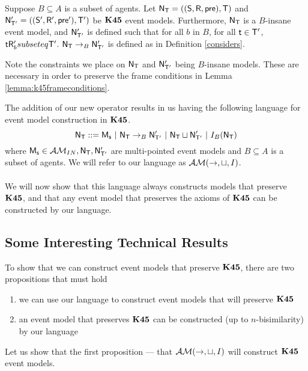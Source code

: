 \begin{defn} \label{defn:k45:considers}
	Suppose $B \subseteq A$ is a subset of agents.
	Let $\mathrm{\mathsf{N}}_\mathrm{\mathsf{T}} = ((\mathrm{\mathsf{S}},\mathrm{\mathsf{R}},\mathrm{\mathsf{pre}}),\mathrm{\mathsf{T}})$ and $\mathrm{\mathsf{N}}'_{\mathrm{\mathsf{T}}'} = ((\mathrm{\mathsf{S}}',\mathrm{\mathsf{R}}',\mathrm{\mathsf{pre}}'),\mathrm{\mathsf{T}}')$ be $\bf K45$ event models.
	Furthermore, $\mathrm{\mathsf{N}}_\mathrm{\mathsf{T}}$ is a $B$-insane event model, and $\mathrm{\mathsf{N}}'_{\mathrm{\mathsf{T}}'}$ is defined such that for
	all $b$ in $B$, for all $\mathrm{\mathsf{t}} \in \mathrm{\mathsf{T}}'$, $\mathrm{\mathsf{t}} \mathrm{\mathsf{R}}'_b subseteq \mathrm{\mathsf{T}}'$.
	$\mathrm{\mathsf{N}}_\mathrm{\mathsf{T}} \to_B \mathrm{\mathsf{N}}'_{\mathrm{\mathsf{T}}'}$ is defined as in Definition \ref{considers}.
\end{defn}

Note the constraints we place on $\mathrm{\mathsf{N}}_\mathrm{\mathsf{T}}$ and $\mathrm{\mathsf{N}}'_{\mathrm{\mathsf{T}}'}$ being $B$-insane models.
These are necessary in order to preserve the frame conditions in Lemma
\ref{lemma:k45frameconditions}.

\newcommand{\EM}{\ensuremath{\eventClass}}

The addition of our new operator results in us having the following language for
event model construction in $\bf K45$.
\[
	\mathrm{\mathsf{N}}_\mathrm{\mathsf{T}} ::= \mathrm{\mathsf{M_s}} \text{ } | \text{ }\mathrm{\mathsf{N}}_\mathrm{\mathsf{T}} \to_B \mathrm{\mathsf{N}}'_{\mathrm{\mathsf{T}}'} \text{ }|
  \text{ } \mathrm{\mathsf{N}}_\mathrm{\mathsf{T}} \sqcup \mathrm{\mathsf{N}}'_{\mathrm{\mathsf{T}}'} \text{ } | \text{ } I_B(\mathrm{\mathsf{N}}_\mathrm{\mathsf{T}})
\]
where $\mathrm{\mathsf{M_s}} \in \mathcal{AM}_{IN}, \mathrm{\mathsf{N}}_\mathrm{\mathsf{T}}, \mathrm{\mathsf{N}}'_{\mathrm{\mathsf{T}}'}$ are multi-pointed event models and $B \subseteq
A$ is a subset of agents.
We will refer to our language as $\EM(\to,\sqcup,I)$. \\
\\
We will now show that this language always constructs models that preserve $\bf K45$, and that any
event model that preserves the axioms of $\bf K45$ can be constructed by our language.

\subsection{Some Interesting Technical Results}

To show that we can construct event models that preserve $\bf K45$, there are two propositions that
must hold
\begin{enumerate}
	\item we can use our language to construct event models that will preserve $\bf K45$
	\item an event model that preserves $\bf K45$ can be constructed (up to $n$-bisimilarity) by our
		language
\end{enumerate}

Let us show that the first proposition --- that $\EM(\to,\sqcup,I)$ will construct $\bf K45$ event
models.

